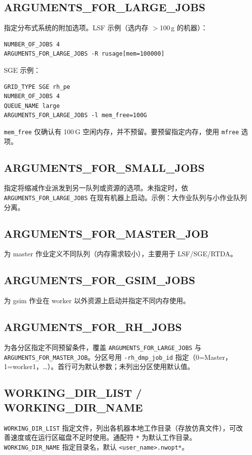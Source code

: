 \subsection{ARGUMENTS\_FOR\_LARGE\_JOBS}
指定分布式系统的附加选项。LSF 示例（选内存 $>$100\,g 的机器）：
\begin{lstlisting}
NUMBER_OF_JOBS 4
ARGUMENTS_FOR_LARGE_JOBS -R rusage[mem=100000]
\end{lstlisting}
SGE 示例：
\begin{lstlisting}
GRID_TYPE SGE rh_pe
NUMBER_OF_JOBS 4
QUEUE_NAME large
ARGUMENTS_FOR_LARGE_JOBS -l mem_free=100G
\end{lstlisting}

\begin{noteBox}
\texttt{mem\_free} 仅确认有 100\,G 空闲内存，并不预留。要预留指定内存，使用 \texttt{mfree} 选项。
\end{noteBox}

\subsection{ARGUMENTS\_FOR\_SMALL\_JOBS}
指定将缩减作业派发到另一队列或资源的选项。未指定时，依 \texttt{ARGUMENTS\_FOR\_LARGE\_JOBS} 在现有机器上启动。示例：大作业队列与小作业队列分离。

\subsection{ARGUMENTS\_FOR\_MASTER\_JOB}
为 master 作业定义不同队列（内存需求较小），主要用于 LSF/SGE/RTDA。

\subsection{ARGUMENTS\_FOR\_GSIM\_JOBS}
为 gsim 作业在 worker 以外资源上启动并指定不同内存使用。

\subsection{ARGUMENTS\_FOR\_RH\_JOBS}
为各分区指定不同预留条件，覆盖 \texttt{ARGUMENTS\_FOR\_LARGE\_JOBS} 与 \texttt{ARGUMENTS\_FOR\_MASTER\_JOB}。分区号用 \texttt{-rh\_dmp\_job\_id} 指定（0=Master，1=worker1，…）。首行可为默认参数；未列出分区使用默认值。

\subsection{WORKING\_DIR\_LIST / WORKING\_DIR\_NAME}
\texttt{WORKING\_DIR\_LIST} 指定文件，列出各机器本地工作目录（存放仿真文件），可改善速度或在运行区磁盘不足时使用。通配符 \texttt{*} 为默认工作目录。\texttt{WORKING\_DIR\_NAME} 指定目录名，默认 \texttt{<user\_name>.nwopt*}。

